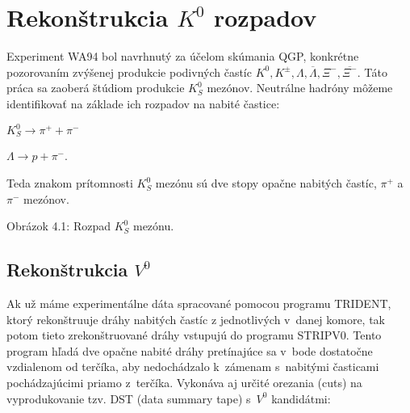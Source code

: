 \chapter{Rekonštrukcia $K^{0}$ rozpadov}
Experiment WA94 bol navrhnutý za účelom skúmania QGP, konkrétne pozorovaním
zvýšenej produkcie podivných častíc $K^{0}, K^{\pm}, \Lambda, 
\overline{\Lambda}, \Xi^{-}, \overline{\Xi^{-}}$. Táto práca sa zaoberá
štúdiom produkcie $K^{0}_{S}$ mezónov. Neutrálne hadróny môžeme identifikovať 
na základe ich rozpadov na nabité častice: \\
\begin{center}
$K^{0}_{S} \longrightarrow \pi^{+} + \pi^{-}$ \\
\end{center}
\begin{center}
$\Lambda \longrightarrow p + \pi^{-}$. \\
\end{center} 
Teda znakom prítomnosti $K^{0}_{S}$ mezónu sú dve stopy opačne nabitých
častíc, $\pi^{+}$ a $\pi^{-}$ mezónov. \\ 
\vspace*{-5cm} \hspace*{-1cm} 

\vspace*{-3cm}
\begin{center}
  Obrázok 4.1: Rozpad $K^{0}_{S}$ mezónu.
\end{center}
\section{Rekonštrukcia $V^{0}$}
Ak už máme experimentálne  dáta spracované pomocou programu TRIDENT, ktorý
rekonštruuje  dráhy nabitých častíc z jednotlivých  v~danej
komore, tak potom tieto zrekonštruované dráhy vstupujú do programu STRIPV0.
Tento program hľadá dve opačne nabité dráhy pretínajúce sa  v~bode dostatočne
vzdialenom od terčíka, aby nedochádzalo k~zámenam s~nabitými časticami  
pochádzajúcimi priamo z~terčíka. Vykonáva aj určité orezania (cuts)
na vyprodukovanie tzv. DST (data summary tape) s~$V^{0}$ kandidátmi:

